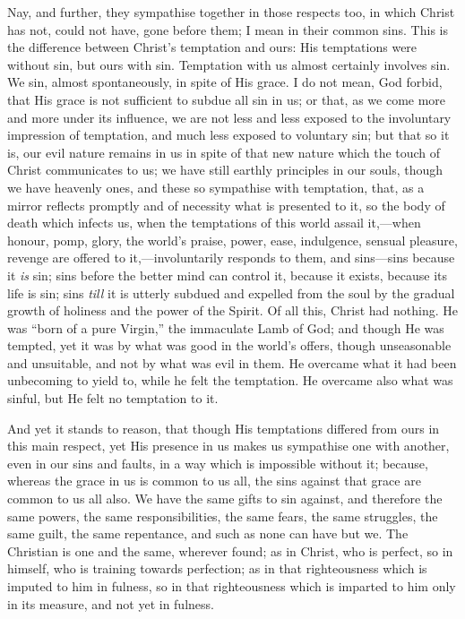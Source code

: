 Nay, and further, they sympathise together in those respects too,
in which Christ has not, could not have, gone before them; I mean in
their common sins. This is the difference between Christ's temptation
and ours: His temptations were without sin, but ours with sin.
Temptation with us almost certainly involves sin. We sin, almost
spontaneously, in spite of His grace. I do not mean, God forbid, that
His grace is not sufficient to subdue all sin in us; or that, as we
come more and more under its influence, we are not less and less
exposed to the involuntary impression of temptation, and much less
exposed to voluntary sin; but that so it is, our evil nature remains
in us in spite of that new nature which the touch of Christ
communicates to us; we have still earthly principles in our souls,
though we have heavenly ones, and these so sympathise with temptation,
that, as a mirror reflects promptly and of necessity what is presented
to it, so the body of death which infects us, when the temptations of
this world assail it,—when honour, pomp, glory, the world's praise,
power, ease, indulgence, sensual pleasure, revenge are offered to it,—involuntarily
responds to them, and sins—sins because it \emph{is} sin; sins
before the better mind can control it, because it exists, because its
life is sin; sins \emph{till} it is utterly subdued and expelled from
the soul by the gradual growth of holiness and the power of the
Spirit. Of all this, Christ had nothing. He was ``born of a pure
Virgin,'' the immaculate Lamb of God; and though He was tempted,
yet it was by what was good in the world's offers, though unseasonable
and unsuitable, and not by what was evil in them. He overcame what it
had been unbecoming to yield to, while he felt the temptation. He
overcame also what was sinful, but He felt no temptation to it.

And yet it stands to reason, that though His temptations differed
from ours in this main respect, yet His presence in us makes us
sympathise one with another, even in our sins and faults, in a way
which is impossible without it; because, whereas the grace in us is
common to us all, the sins against that grace are common to us all
also. We have the same gifts to sin against, and therefore the same
powers, the same responsibilities, the same fears, the same struggles,
the same guilt, the same repentance, and such as none can have but we.
The Christian is one and the same, wherever found; as in Christ, who
is perfect, so in himself, who is training towards perfection; as in
that righteousness which is imputed to him in fulness, so in that
righteousness which is imparted to him only in its measure, and not
yet in fulness.


